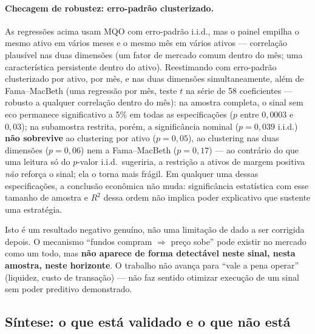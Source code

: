 \documentclass[11pt,a4paper]{article}
\begin{document}
\paragraph{Checagem de robustez: erro-padrão clusterizado.} As regressões acima usam MQO com
erro-padrão i.i.d., mas o painel empilha o mesmo ativo em vários meses e o mesmo mês em vários
ativos --- correlação plausível nas duas dimensões (um fator de mercado comum dentro do mês; uma
característica persistente dentro do ativo). Reestimando com erro-padrão clusterizado por ativo,
por mês, e nas duas dimensões simultaneamente, além de Fama--MacBeth (uma regressão por mês,
teste $t$ na série de 58 coeficientes --- robusto a qualquer correlação dentro do mês): na
amostra completa, o sinal sem eco permanece significativo a 5\% em todas as especificações
($p$ entre $0{,}0003$ e $0{,}03$); na subamostra restrita, porém, a significância nominal
($p=0{,}039$ i.i.d.) \textbf{não sobrevive} ao clustering por ativo ($p=0{,}05$), ao clustering
nas duas dimensões ($p=0{,}06$) nem a Fama--MacBeth ($p=0{,}17$) --- ao contrário do que uma
leitura só do $p$-valor i.i.d.\ sugeriria, a restrição a ativos de margem positiva \emph{não}
reforça o sinal; ela o torna mais frágil. Em qualquer uma dessas especificações, a conclusão
econômica não muda: significância estatística com esse tamanho de amostra e $R^2$ dessa ordem não
implica poder explicativo que sustente uma estratégia.

Isto é um resultado negativo genuíno, não uma limitação de dado a ser corrigida depois. O
mecanismo ``fundos compram $\Rightarrow$ preço sobe'' pode existir no mercado como um todo, mas
\textbf{não aparece de forma detectável neste sinal, nesta amostra, neste horizonte}. O
trabalho não avança para ``vale a pena operar'' (liquidez, custo de transação) --- não faz
sentido otimizar execução de um sinal sem poder preditivo demonstrado.

\FloatBarrier
\subsection{Síntese: o que está validado e o que não está}
\end{document}
